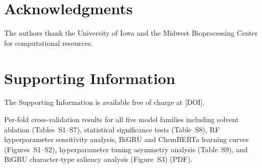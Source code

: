 \section*{Acknowledgments}
The authors thank the University of Iowa and the Midwest Bioprocessing Center for computational resources.

\section*{Supporting Information}
The Supporting Information is available free of charge at [DOI].

Per-fold cross-validation results for all five model families including solvent ablation (Tables~S1--S7), statistical significance tests (Table~S8), RF hyperparameter sensitivity analysis, BiGRU and ChemBERTa learning curves (Figures~S1--S2), hyperparameter tuning asymmetry analysis (Table~S9), and BiGRU character-type saliency analysis (Figure~S3) (PDF).
